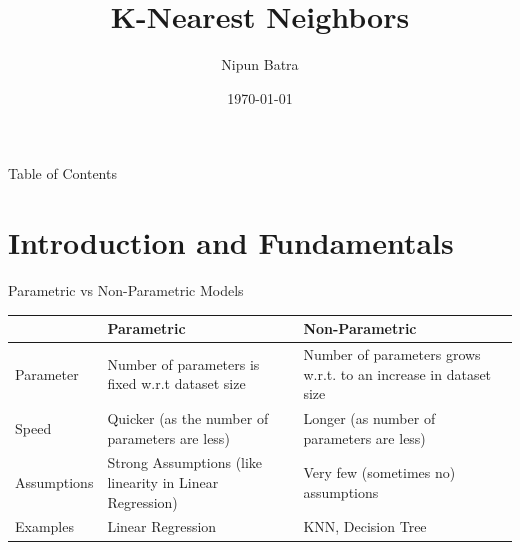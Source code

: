 \documentclass[usenames,dvipsnames]{beamer}
\title{K-Nearest Neighbors}
\date{\today}
\author{Nipun Batra}
\institute{IIT Gandhinagar}
\begin{document}
\maketitle

\begin{frame}{Table of Contents}
\tableofcontents
\end{frame}

\section{Introduction and Fundamentals}

{
	
}

{
	
}


\begin{frame}{Parametric vs Non-Parametric Models}
\begin{table}[]
\begin{tabular}{|l|p{3.5cm}|p{3.5cm}|}
\hline
            & Parametric                                               & Non-Parametric                                                   \\ \hline
Parameter   & Number of parameters is fixed w.r.t dataset size         & Number of parameters grows w.r.t. to an increase in dataset size \\ \hline
Speed       & Quicker (as the number of parameters are less)           & Longer (as number of parameters are less)                        \\ \hline
Assumptions & Strong Assumptions (like linearity in Linear Regression) & Very few (sometimes no) assumptions                              \\ \hline
Examples    & Linear Regression                                        & KNN, Decision Tree                     \\ \hline                         
\end{tabular}
\end{table}
\end{frame}
\end{document}
